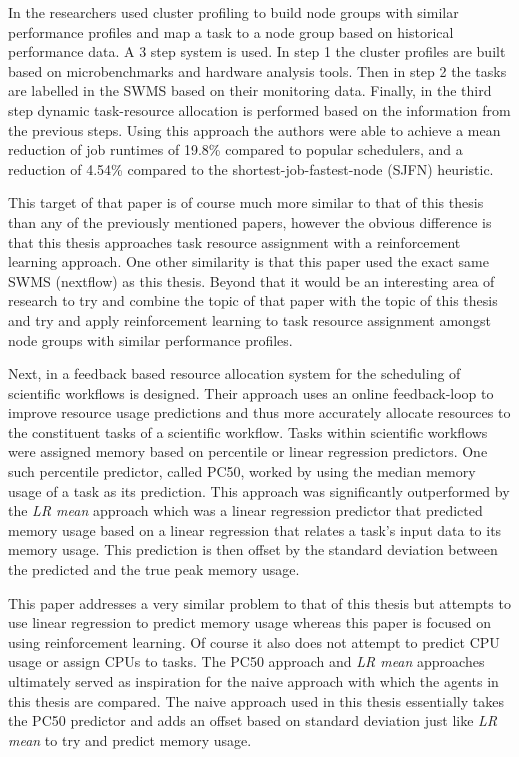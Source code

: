  In \cite{tarema} the researchers used cluster profiling to build node groups with similar performance profiles and map a task to a node group based on historical performance data. A 3 step system is used. In step 1 the cluster profiles are built based on microbenchmarks and hardware analysis tools. Then in step 2 the tasks are labelled in the SWMS based on their monitoring data. Finally, in the third step dynamic task-resource allocation is performed based on the information from the previous steps. Using this approach the authors were able to achieve a mean reduction of job runtimes of 19.8\% compared to popular schedulers, and a reduction of 4.54\% compared to the shortest-job-fastest-node (SJFN) heuristic. 

This target of that paper is of course much more similar to that of this thesis than any of the previously mentioned papers, however the obvious difference is that this thesis approaches task resource assignment with a reinforcement learning approach. One other similarity is that this paper used the exact same SWMS (nextflow) as this thesis. Beyond that it would be an interesting area of research to try and combine the topic of that paper with the topic of this thesis and try and apply reinforcement learning to task resource assignment amongst node groups with similar performance profiles.

Next, in \cite{FeedbackBasedAllocation} a feedback based resource allocation system for the scheduling of scientific workflows is designed. Their approach uses an online feedback-loop to improve resource usage predictions and thus more accurately allocate resources to the constituent tasks of a scientific workflow. Tasks within scientific workflows were assigned memory based on percentile or linear regression predictors. One such percentile predictor, called PC50, worked by using the median memory usage of a task as its prediction. This approach was significantly outperformed by the \textit{LR mean} approach which was a linear regression predictor that predicted memory usage based on a linear regression that relates a task’s input data to its memory usage. This prediction is then offset by the standard deviation between the predicted and the true peak memory usage.

This paper addresses a very similar problem to that of this thesis but attempts to use linear regression to predict memory usage whereas this paper is focused on using reinforcement learning. Of course it also does not attempt to predict CPU usage or assign CPUs to tasks. The PC50 approach and \textit{LR mean} approaches ultimately served as inspiration for the naive approach with which the agents in this thesis are compared. The naive approach used in this thesis essentially takes the PC50 predictor and adds an offset based on standard deviation just like \textit{LR mean} to try and predict memory usage. 

